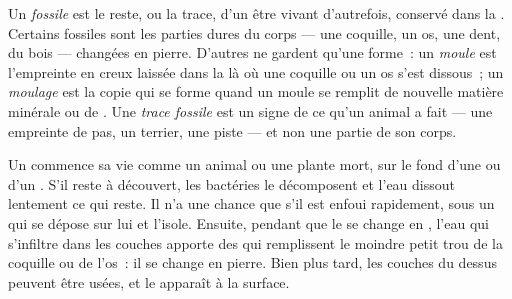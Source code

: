 \begin{definition}[Fossile]\label{def:g7:sediments-and-fossils:fossil}
Un \emph{fossile} est le reste, ou la trace, d'un être vivant
d'autrefois, conservé dans la . Certains fossiles sont les parties
dures du corps --- une coquille, un os, une dent, du bois --- changées en
pierre. D'autres ne gardent qu'une forme~: un \emph{moule} est
l'empreinte en creux laissée dans la  là où une coquille ou un os
s'est dissous~; un \emph{moulage} est la copie qui se forme
quand un moule se remplit de nouvelle matière minérale ou de . Une
\emph{trace fossile} est un signe de ce qu'un animal a
fait --- une empreinte de pas, un terrier, une piste --- et non une partie
de son corps.
\end{definition}

Un  commence sa vie comme un animal ou une plante mort, sur le fond
d'une  ou d'un . S'il reste à découvert, les bactéries le
décomposent et l'eau dissout lentement ce qui reste. Il n'a une chance que
s'il est enfoui rapidement, sous un  qui se dépose sur lui et
l'isole. Ensuite, pendant que le  se change en , l'eau qui
s'infiltre dans les couches apporte des  qui remplissent le
moindre petit trou de la coquille ou de l'os~: il se change en pierre.
Bien plus tard, les couches du dessus peuvent être usées, et le 
apparaît à la surface.

